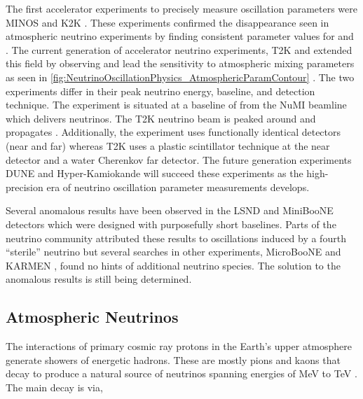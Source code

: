 The first accelerator experiments to precisely measure oscillation parameters were MINOS \cite{PhysRevLett.97.191801} and K2K \cite{PhysRevLett.9.36}.
These experiments confirmed the \quickmath{\nu_{\mu}} disappearance seen in atmospheric neutrino experiments by finding consistent parameter values for  and .
The current generation of accelerator neutrino experiments, T2K and  extended this field by observing  and lead the sensitivity to atmospheric mixing parameters as seen in \autoref{fig:NeutrinoOscillationPhysics_AtmosphericParamContour} \cite{PhysRevLett.123.151803}.
The two experiments differ in their peak neutrino energy, baseline, and detection technique.
The  experiment is situated at a baseline of  from the NuMI beamline which delivers  neutrinos.
The T2K neutrino beam is peaked around  and propagates .
Additionally, the  experiment uses functionally identical detectors (near and far) whereas T2K uses a plastic scintillator technique at the near detector and a water Cherenkov far detector.
The future generation experiments DUNE \cite{Abi2020-cm} and Hyper-Kamiokande \cite{Hyper-Kamiokande_Proto-Collaboration2015-ac} will succeed these experiments as the high-precision era of neutrino oscillation parameter measurements develops.

Several anomalous results have been observed in the LSND \cite{PhysRevD.64.112007} and MiniBooNE \cite{PhysRevLett.110.161801} detectors which were designed with purposefully short baselines. Parts of the neutrino community attributed these results to oscillations induced by a fourth ``sterile'' neutrino \cite{Blanco_2020} but several searches in other experiments, MicroBooNE \cite{10.48550/arxiv.2110.14054} and KARMEN \cite{PhysRevD.65.112001}, found no hints of additional neutrino species. The solution to the anomalous results is still being determined.

\subsection{Atmospheric Neutrinos}
\label{subsec:NeutrinoOscillationPhysics_AtmosphericNeutrinos}

The interactions of primary cosmic ray protons in the Earth's upper atmosphere generate showers of energetic hadrons. These are mostly pions and kaons that decay to produce a natural source of neutrinos spanning energies of MeV to TeV \cite{Gaisser2002-gl}. The main decay is via,

